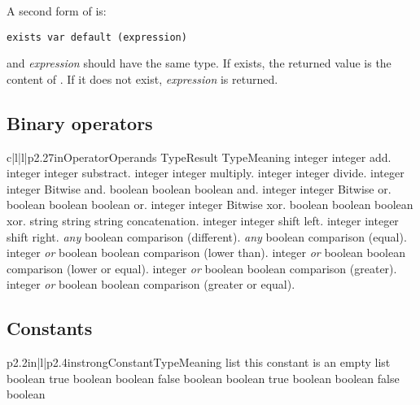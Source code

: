 A second form of  is:
 
\begin{lstlisting}
exists var default (expression)
\end{lstlisting}

 and {\em expression} should have the same type. If  exists, the returned value is the content of . If it does not exist, {\em expression} is returned.


\subsection{Binary operators}

\begin{longtableiv}{c|l|l|p{2.27in}}{}{Operator}{Operands Type}{Result Type}{Meaning}
  \lineiv{+}
  {integer}
  {integer}
  {add.}
  \lineiv{-}
  {integer}
  {integer}
  {substract.}
  \lineiv{*}
  {integer}
  {integer}
  {multiply.}
  \lineiv{/}
  {integer}
  {integer}
  {divide.}
  \lineiv{\&}
  {integer}
  {integer}
  {Bitwise and.}
  \lineiv{\&}
  {boolean}
  {boolean}
  {boolean and.}
  \lineiv{$\mid$}
  {integer}
  {integer}
  {Bitwise or.}
  \lineiv{$\mid$}
  {boolean}
  {boolean}
  {boolean or.}
  \lineiv{$\wedge$}
  {integer}
  {integer}
  {Bitwise xor.}
  \lineiv{$\wedge$}
  {boolean}
  {boolean}
  {boolean xor.}
  {string}
  {string}
  {string concatenation.}
  \lineiv{$<<$}
  {integer}
  {integer}
  {shift left.}
  \lineiv{$>>$}
  {integer}
  {integer}
  {shift right.}
  \lineiv{!=}
  {{\em any}}
  {boolean}
  {comparison (different).}
  \lineiv{==}
  {{\em any}}
  {boolean}
  {comparison (equal).}
  \lineiv{$<$}
  {integer {\em or} boolean}
  {boolean}
  {comparison (lower than).}
  \lineiv{$<=$}
  {integer {\em or} boolean}
  {boolean}
  {comparison (lower or equal).}
  \lineiv{$>$}
  {integer {\em or} boolean}
  {boolean}
  {comparison (greater).}
  \lineiv{$>=$}
  {integer {\em or} boolean}
  {boolean}
  {comparison (greater or equal).}
\end{longtableiv}

\subsection{Constants}

\begin{longtableiii}{p{2.2in}|l|p{2.4in}}{strong}{Constant}{Type}{Meaning}
  {list}
  {this constant is an empty list}
  {boolean}
  {true boolean}
  {boolean}
  {false boolean}
  {boolean}
  {true boolean}
  {boolean}
  {false boolean}
\end{longtableiii}

